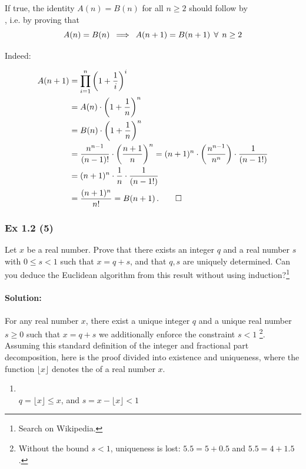 {{If true, the identity $A(n) = B(n)$ for all $n \geq 2$ should follow by\\ , i.e. by proving that 
$$ A(n) = B(n) \text{\:}\implies \text{\:}  A(n+1) = B(n+1) \:\: \forall \:\: n \geq 2$$

Indeed:

\begin{align*}
A(n+1) &= \prod_{i=1}^n \left( 1 + \frac{1}{i} \right)^i\\
       &= A(n) \cdot  \left( 1 + \frac{1}{n} \right)^n\\
       &= B(n) \cdot  \left( 1 + \frac{1}{n} \right)^n\\
       &= \frac{n^{n-1}}{(n-1)!}  \cdot  \left(\frac{n+1}{n}\right)^n = (n+1)^n \cdot \left(\frac{n^{n-1}}{n^n}\right) \cdot \frac{1}{(n-1!)}\\
       &= (n+1)^n \cdot \frac{1}{n} \cdot \frac{1}{(n-1!)}\\
       &= \frac{(n+1)^n}{n!} = B(n+1)\,. \qed   
\end{align*}

}


\subsubsection{Ex 1.2 (5)}\label{sec:Ex_1.2.5}

Let $x$ be a real number. Prove that there exists an integer $q$ and a real number $s$
with $0 \leq s < 1$ such that $x = q + s$, and that $q, s$ are uniquely determined. 
Can you deduce the Euclidean algorithm from this result without using induction?\footnote{Search   on Wikipedia.}

\paragraph{Solution:}{
For any real number $x$, there exist a unique integer $q$ and a unique real number $s \geq 0$
such that $x = q + s$  we additionally enforce the constraint $s < 1$
\footnote{Without the bound $s < 1$, uniqueness is lost: $5.5 = 5 + 0.5$ and $5.5 = 4 + 1.5$.}.
Assuming this standard definition of the integer and fractional part decomposition, here is the proof divided into
existence and uniqueness, where the  function $\lfloor x \rfloor$ denotes the  of a real number $x$. 
\begin{enumerate}
\item {}\\
$q = \lfloor x \rfloor \leq x$, and $ s = x - \lfloor x \rfloor < 1$


\end{enumerate}}}
